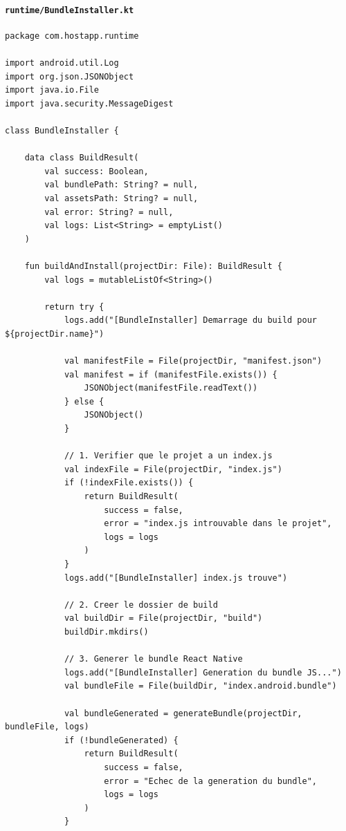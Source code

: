 \documentclass[11pt]{article}
\begin{document}
\paragraph{\texttt{runtime/BundleInstaller.kt}}

\begin{verbatim}
package com.hostapp.runtime

import android.util.Log
import org.json.JSONObject
import java.io.File
import java.security.MessageDigest

class BundleInstaller {

    data class BuildResult(
        val success: Boolean,
        val bundlePath: String? = null,
        val assetsPath: String? = null,
        val error: String? = null,
        val logs: List<String> = emptyList()
    )

    fun buildAndInstall(projectDir: File): BuildResult {
        val logs = mutableListOf<String>()

        return try {
            logs.add("[BundleInstaller] Demarrage du build pour ${projectDir.name}")

            val manifestFile = File(projectDir, "manifest.json")
            val manifest = if (manifestFile.exists()) {
                JSONObject(manifestFile.readText())
            } else {
                JSONObject()
            }

            // 1. Verifier que le projet a un index.js
            val indexFile = File(projectDir, "index.js")
            if (!indexFile.exists()) {
                return BuildResult(
                    success = false,
                    error = "index.js introuvable dans le projet",
                    logs = logs
                )
            }
            logs.add("[BundleInstaller] index.js trouve")

            // 2. Creer le dossier de build
            val buildDir = File(projectDir, "build")
            buildDir.mkdirs()

            // 3. Generer le bundle React Native
            logs.add("[BundleInstaller] Generation du bundle JS...")
            val bundleFile = File(buildDir, "index.android.bundle")

            val bundleGenerated = generateBundle(projectDir, bundleFile, logs)
            if (!bundleGenerated) {
                return BuildResult(
                    success = false,
                    error = "Echec de la generation du bundle",
                    logs = logs
                )
            }


\end{verbatim}
\end{document}

